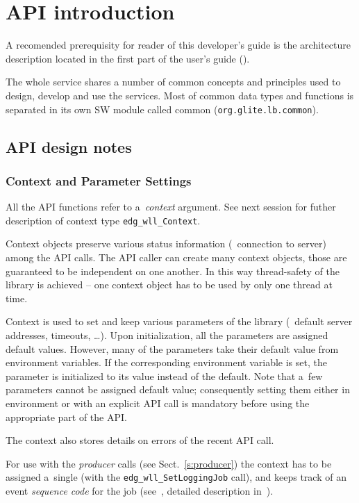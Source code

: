 
\section{\LB API introduction}


A recomended prerequisity for reader of this developer's guide is the
\LB architecture description located in the first part of
the \LB user's guide (\cite{LBUG}).

The whole \LB service shares a number of common concepts and
principles used to design, develop and use the services. Most of
common data types and functions is separated in its own SW module called
\LB common (\texttt{org.glite.lb.common}).

\subsection{\LB API design notes}

\subsubsection{Context and Parameter Settings}
\label{s:context}

All the API functions refer to a~\emph{context} argument. See next
session for futher description of context type \verb'edg_wll_Context'.

Context objects preserve various status information
(\eg\ connection to server) among the API calls.
The API caller can create many context objects, those are guaranteed
to be independent on one another.
In this way thread-safety of the library is achieved --
one context object has to be used by only one thread at time.

Context is used to set and keep various parameters of the library
(\eg\ default server addresses, timeouts, \dots).
Upon initialization, all the parameters are assigned default values.
However, many of the parameters take their default value from environment
variables. If the corresponding environment variable is set,
the parameter is initialized to its value instead of the default.
Note that a~few parameters cannot be assigned default value; consequently
setting them either in environment or with an explicit API call
is mandatory before using the appropriate part of the API.

The context also stores details on errors of the recent API call.

For use with the \emph{producer} calls (see Sect.~\ref{s:producer})
the context has to be assigned a~single \jobid
(with the \verb'edg_wll_SetLoggingJob' call),
and keeps track of an event \emph{sequence code} for the job 
(see~\cite{LBUG}, detailed description in~\cite{lbarch}).

